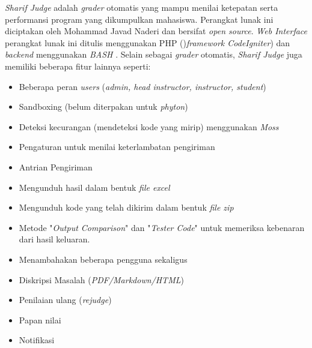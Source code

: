 \textit{Sharif Judge} adalah \textit{grader} otomatis yang mampu menilai ketepatan serta performansi program yang dikumpulkan mahasiswa. Perangkat lunak ini diciptakan oleh Mohammad Javad Naderi dan bersifat \textit{open source}. \textit{Web Interface} perangkat lunak ini ditulis menggunakan PHP ()\textit{framework CodeIgniter}) dan \textit{backend} menggunakan \textit{BASH} \cite{mjnaderi:14:sharifjudge}.
Selain sebagai \textit{grader} otomatis, \textit{Sharif Judge} juga memiliki beberapa fitur lainnya seperti:
\begin{itemize}
	\item Beberapa peran \textit{users} (\textit{admin, head instructor, instructor, student})
	\item Sandboxing (belum diterpakan untuk \textit{phyton})
	\item Deteksi kecurangan (mendeteksi kode yang mirip) menggunakan \textit{Moss}
	\item Pengaturan untuk menilai keterlambatan pengiriman
	\item Antrian Pengiriman
	\item Mengunduh hasil dalam bentuk \textit{file excel}
	\item Mengunduh kode yang telah dikirim dalam bentuk \textit{file zip}
	\item Metode "\textit{Output Comparison}" dan "\textit{Tester Code}" untuk memeriksa kebenaran dari hasil keluaran.
	\item Menambahakan beberapa pengguna sekaligus
	\item Diskripsi Masalah (\textit{PDF/Markdown/HTML})
	\item Penilaian ulang (\textit{rejudge})
	\item Papan nilai
	\item Notifikasi
\end{itemize}

